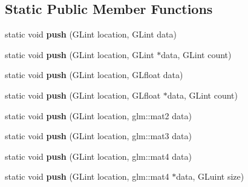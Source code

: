 \subsection*{Static Public Member Functions}
\begin{DoxyCompactItemize}
\item 
\hypertarget{classfillwave_1_1core_1_1Uniform_a0ecd06de372377403c090170317a1dc9}{}static void {\bfseries push} (G\+Lint location, G\+Lint data)\label{classfillwave_1_1core_1_1Uniform_a0ecd06de372377403c090170317a1dc9}

\item 
\hypertarget{classfillwave_1_1core_1_1Uniform_a22d1a48b04d69fce26934fecaf0e924a}{}static void {\bfseries push} (G\+Lint location, G\+Lint $\ast$data, G\+Lint count)\label{classfillwave_1_1core_1_1Uniform_a22d1a48b04d69fce26934fecaf0e924a}

\item 
\hypertarget{classfillwave_1_1core_1_1Uniform_a1ee375e9608fecc9f3c28379a8e14d28}{}static void {\bfseries push} (G\+Lint location, G\+Lfloat data)\label{classfillwave_1_1core_1_1Uniform_a1ee375e9608fecc9f3c28379a8e14d28}

\item 
\hypertarget{classfillwave_1_1core_1_1Uniform_a51fbc2e20c79aed26318e74d4b76015c}{}static void {\bfseries push} (G\+Lint location, G\+Lfloat $\ast$data, G\+Lint count)\label{classfillwave_1_1core_1_1Uniform_a51fbc2e20c79aed26318e74d4b76015c}

\item 
\hypertarget{classfillwave_1_1core_1_1Uniform_aed5da5309f0c889fe22796c882c751bf}{}static void {\bfseries push} (G\+Lint location, glm\+::mat2 data)\label{classfillwave_1_1core_1_1Uniform_aed5da5309f0c889fe22796c882c751bf}

\item 
\hypertarget{classfillwave_1_1core_1_1Uniform_a723c024637e7df7068e71a9734e5b8f9}{}static void {\bfseries push} (G\+Lint location, glm\+::mat3 data)\label{classfillwave_1_1core_1_1Uniform_a723c024637e7df7068e71a9734e5b8f9}

\item 
\hypertarget{classfillwave_1_1core_1_1Uniform_affcb55cf6b723e965d57db558f8b3712}{}static void {\bfseries push} (G\+Lint location, glm\+::mat4 data)\label{classfillwave_1_1core_1_1Uniform_affcb55cf6b723e965d57db558f8b3712}

\item 
\hypertarget{classfillwave_1_1core_1_1Uniform_a5e00ec1074a7bc9e92949d1183b48aeb}{}static void {\bfseries push} (G\+Lint location, glm\+::mat4 $\ast$data, G\+Luint size)\label{classfillwave_1_1core_1_1Uniform_a5e00ec1074a7bc9e92949d1183b48aeb}


\end{DoxyCompactItemize}
